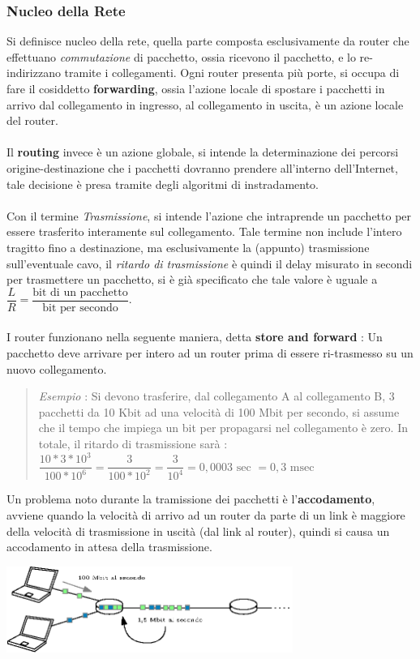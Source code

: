 \documentclass[12pt, letterpaper]{article}
\newcommand{\acc}{\\\hphantom{}\\}
\begin{document}
\subsubsection{Nucleo della Rete}
Si definisce nucleo della rete, quella parte composta esclusivamente da router  che effettuano \textit{commutazione} di pacchetto, ossia
ricevono il pacchetto, e lo re-indirizzano tramite i collegamenti. Ogni router presenta più porte, si occupa di fare il
cosiddetto \textbf{forwarding}, ossia l'azione locale di spostare i pacchetti in arrivo dal collegamento in ingresso, al collegamento
in uscita, è un azione locale del router.\acc
Il \textbf{routing} invece è un azione globale, si intende la determinazione dei percorsi origine-destinazione che i pacchetti
dovranno prendere all'interno dell'Internet, tale decisione è presa tramite degli algoritmi di instradamento.\acc
Con il termine \textit{Trasmissione}, si intende l'azione che intraprende un pacchetto per essere trasferito interamente
sul collegamento. Tale termine non include l'intero tragitto fino a destinazione, ma esclusivamente la (appunto) trasmissione sull'eventuale
cavo, il \textit{ritardo di trasmissione} è quindi il delay misurato in secondi per trasmettere un pacchetto, si è già specificato che tale
valore è uguale a $\dfrac{L}{R}=\dfrac{\text{bit di un pacchetto}}{\text{bit per secondo}}$.\acc
I router funzionano nella seguente maniera, detta \textbf{store and forward} : Un pacchetto deve arrivare per intero ad un router
prima di essere ri-trasmesso su un nuovo collegamento.\begin{quote}
    \color{gray} \textit{Esempio} : Si devono trasferire, dal collegamento A al collegamento B, 3 pacchetti da 10 Kbit ad una
    velocità di 100 Mbit per secondo, si assume che il  tempo che impiega un bit per propagarsi nel collegamento è zero.
    In totale, il ritardo di trasmissione sarà : $\dfrac{10*3*10^3}{100*10^6}=\dfrac{3}{100*10^2}=\dfrac{3}{10^4}=0,0003\text{ sec }=0,3\text{ msec }$
    \color{black}
\end{quote}
Un problema noto durante la tramissione dei pacchetti è l'\textbf{accodamento}, avviene quando la velocità di arrivo ad
un router da parte di un link è maggiore della velocità di trasmissione in uscità (dal link al router), quindi si causa un
accodamento in attesa della trasmissione.\begin{center}
    \includegraphics[width=0.7\textwidth ]{images/accodamento.ip.eps}
\end{center}
\end{document}
